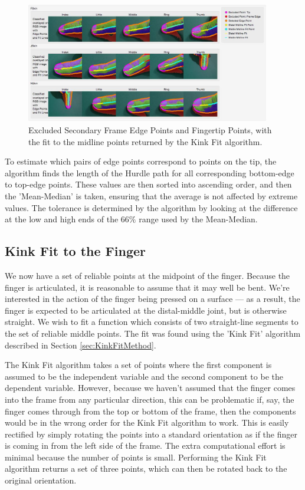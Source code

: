 \begin{figure}[h!]
  \centering
    \includegraphics[width=0.95\textwidth]{Chapter4/Figs/ExcludedEdgePointsAndMidlineFit.jpg}
    \caption{Excluded Secondary Frame Edge Points and Fingertip Points, with the fit to the midline points returned by the Kink Fit algorithm.}\label{fig:ExcludedEdgePointsAndMidlineFit}
\end{figure}

To estimate which pairs of edge points correspond to points on the tip, the algorithm finds the length of the Hurdle path for all corresponding bottom-edge to top-edge points. These values are then sorted into ascending order, and then the 'Mean-Median' is taken, ensuring that the average is not affected by extreme values. The tolerance is determined by the algorithm by looking at the difference at the low and high ends of the $66\%$ range used by the Mean-Median.

\subsection{Kink Fit to the Finger}\label{sec:KinkFitToTheFinger}
We now have a set of reliable points at the midpoint of the finger. Because the finger is articulated, it is reasonable to assume that it may well be bent. We're interested in the action of the finger being pressed on a surface --- as a result, the finger is expected to be articulated at the distal-middle joint, but is otherwise straight. We wish to fit a function which consists of two straight-line segments to the set of reliable middle points. The fit was found using the 'Kink Fit' algorithm described in Section \ref{sec:KinkFitMethod}.

The Kink Fit algorithm takes a set of points where the first component is assumed to be the independent variable and the second component to be the dependent variable. However, because we haven't assumed that the finger comes into the frame from any particular direction, this can be problematic if, say, the finger comes through from the top or bottom of the frame, then the components would be in the wrong order for the Kink Fit algorithm to work. This is easily rectified by simply rotating the points into a standard orientation as if the finger is coming in from the left side of the frame. The extra computational effort is minimal because the number of points is small. Performing the Kink Fit algorithm returns a set of three points, which can then be rotated back to the original orientation.

